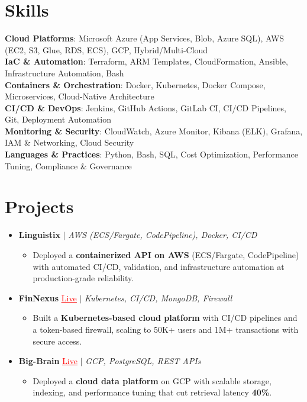 \documentclass[letterpaper,10pt]{article}
\newcommand{\resumeItem}[1]{\item\small{{#1 \vspace{-2pt}}}}
\newcommand{\resumeProjectHeading}[1]{\item \small #1 \vspace{-2pt}}
\newcommand{\resumeSubHeadingListStart}{\begin{itemize}[leftmargin=0.0in, label={}]}
\newcommand{\resumeSubHeadingListEnd}{\end{itemize}}
\newcommand{\resumeProjItemListStart}{\begin{itemize}[leftmargin=0.15in,label=\textbullet,itemsep=0pt,topsep=0pt,parsep=0pt,partopsep=0pt]}
\newcommand{\resumeProjItemListEnd}{\end{itemize}\vspace{-4pt}}
\begin{document}
\section{Skills}
\begin{itemize}[leftmargin=0.15in, label={}]
\small{\item{
\textbf{Cloud Platforms}: Microsoft Azure (App Services, Blob, Azure SQL), AWS (EC2, S3, Glue, RDS, ECS), GCP, Hybrid/Multi-Cloud \\
\textbf{IaC \& Automation}: Terraform, ARM Templates, CloudFormation, Ansible, Infrastructure Automation, Bash \\
\textbf{Containers \& Orchestration}: Docker, Kubernetes, Docker Compose, Microservices, Cloud-Native Architecture \\
\textbf{CI/CD \& DevOps}: Jenkins, GitHub Actions, GitLab CI, CI/CD Pipelines, Git, Deployment Automation \\
\textbf{Monitoring \& Security}: CloudWatch, Azure Monitor, Kibana (ELK), Grafana, IAM \& Networking, Cloud Security \\
\textbf{Languages \& Practices}: Python, Bash, SQL, Cost Optimization, Performance Tuning, Compliance \& Governance
}}
\end{itemize}
\vspace{-6pt}
\section{Projects}
\resumeSubHeadingListStart
\vspace{-2pt}
\resumeProjectHeading{\textbf{Linguistix} $|$ \emph{AWS (ECS/Fargate, CodePipeline), Docker, CI/CD}}
\resumeProjItemListStart
\resumeItem{Deployed a \textbf{containerized API on AWS} (ECS/Fargate, CodePipeline) with automated CI/CD, validation, and infrastructure automation at production-grade reliability.}
\resumeProjItemListEnd
\vspace{3pt}
\resumeProjectHeading{\textbf{FinNexus} {\href{https://fin-nexus.vercel.app/}{\textcolor{red}{\underline{Live}}}} $|$ \emph{Kubernetes, CI/CD, MongoDB, Firewall}}
\resumeProjItemListStart
\resumeItem{Built a \textbf{Kubernetes-based cloud platform} with CI/CD pipelines and a token-based firewall, scaling to 50K+ users and 1M+ transactions with secure access.}
\resumeProjItemListEnd
\vspace{3pt}
\resumeProjectHeading{\textbf{Big-Brain} {\href{https://big-brain-pied.vercel.app/}{\textcolor{red}{\underline{Live}}}} $|$ \emph{GCP, PostgreSQL, REST APIs}}
\resumeProjItemListStart
\resumeItem{Deployed a \textbf{cloud data platform} on GCP with scalable storage, indexing, and performance tuning that cut retrieval latency \textbf{40\%}.}
\resumeProjItemListEnd
\resumeSubHeadingListEnd
\end{document}

